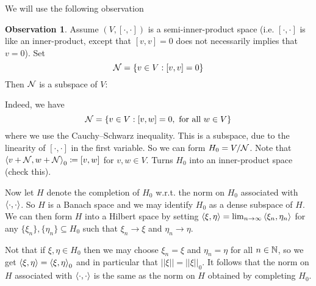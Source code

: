 \documentclass[10pt,english,a4paper]{article}
\theoremstyle{definition}
\newtheorem*{observation}{Observation}
\begin{document}
We will use the following observation
\begin{observation}
    Assume $(V,[\cdot,\cdot])$ is a semi-inner-product space 
(i.e. $[\cdot,\cdot]$ is like an inner-product, except that 
$[v,v] = 0$ does not necessarily implies that $v=0$).
Set 
\[ \mathcal{N} = \{v \in V : [v,v] = 0\} \]
Then $\mathcal{N}$ is a subspace of $V$:

Indeed, we have 
\[ \mathcal{N} = \{v \in V : [v,w] = 0, \text{ for all }w \in V\} \]
where we use the Cauchy–Schwarz inequality. This is a subspace, due to
the linearity of $[\cdot,\cdot]$ in the first variable.
So we can form $H_0 = V/\mathcal{N}$. Note that 
$\left\langle v +\mathcal{N}, w + \mathcal{N} \right\rangle_0 \coloneqq [v,w]$ for $v,w \in V$. 
Turns $H_0$ into an inner-product space (check this).

Now let $H$ denote the completion of $H_0$ w.r.t. the norm on $H_0$
associated with $\left\langle \cdot,\cdot \right\rangle$. So $H$ is a Banach space and we may 
identify $H_0$ as a dense subspace of $H$. We can 
then form $H$ into a Hilbert space by setting 
$\left\langle \xi,\eta \right\rangle = \lim_{n\to\infty} \left\langle \xi_n,\eta_n \right\rangle$ for 
any $\{\xi_n\}, \{\eta_n\}\subseteq H_0$ such that $\xi_n\to \xi$ and 
$\eta_n\to \eta$. 

Not that if $\xi,\eta\in H_0$ then we may choose $\xi_n=\xi$ and $\eta_n =\eta$ for all
$n\in\mathbb{N}$, so we get $\left\langle \xi,\eta \right\rangle = \left\langle \xi,\eta \right\rangle_{0}$ and in particular 
that $||\xi|| = ||\xi||_0$.
It follows that the norm on $H$ associated with $\left\langle \cdot,\cdot \right\rangle$ is the same 
as the norm on $H$ obtained by completing $H_0$.

\end{observation}
\end{document}
